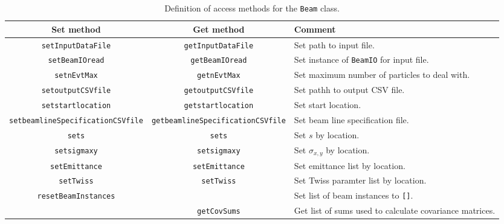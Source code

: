 \begin{sidewaystable}[h]
  \caption{
    Definition of access methods for the \texttt{Beam}
    class. 
  }
  \label{Tab:B:AccessMethods}
  \begin{center}
    \begin{tabular}{|c|c|p{9cm}|}
      \hline
      \textbf{Set method} & \textbf{Get method}  & \textbf{Comment}                                                      \\
      \hline
      \texttt{setInputDataFile}                & \texttt{getInputDataFile}                & Set path to input file.      \\
      \texttt{setBeamIOread}                   & \texttt{getBeamIOread}                   & Set instance of \texttt{BeamIO} for input file.  \\
      \texttt{setnEvtMax}                      & \texttt{getnEvtMax}                      & Set maximum number of particles to deal with.    \\
      \texttt{setoutputCSVfile}                & \texttt{getoutputCSVfile}                & Set pathh to output CSV file.                    \\
      \texttt{setstartlocation}                & \texttt{getstartlocation}                & Set start location.                              \\
      \texttt{setbeamlineSpecificationCSVfile} & \texttt{getbeamlineSpecificationCSVfile} & Set beam line specification file.                \\
      \texttt{sets}                            & \texttt{sets}                            & Set $s$ by location.                             \\
      \texttt{setsigmaxy}                      & \texttt{setsigmaxy}                      & Set $\sigma_{x,y}$ by location.                   \\
      \texttt{setEmittance}                    & \texttt{setEmittance}                    & Set emittance list by location.                  \\
      \texttt{setTwiss}                        & \texttt{setTwiss}                        & Set Twiss paramter list by location.             \\
      \texttt{resetBeamInstances}              &                                          & Set list of beam instances to \texttt{[]}.       \\
                                               & \texttt{getCovSums}                      & Get list of sums used to calculate covariance matrices. \\

\end{tabular}
\end{center}
\end{sidewaystable}
